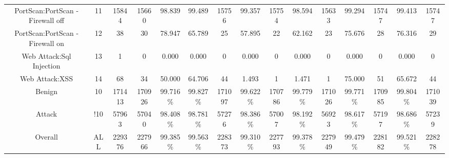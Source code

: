 \begin{table}[htb]
\begin{tabular}{@{}ccccccccccccccc@{}}
        PortScan:PortScan - Firewall off &  11 &  15844 &  15660 &  98.839 &  99.489 &  15756 &  99.357 &  15754 &  98.594 &  15633 &  99.294 &  15747 &  99.413 &  15747 \\
        PortScan:PortScan - Firewall on &  12 &  38 &  30 &  78.947 &  65.789 &  25 &  57.895 &  22 &  62.162 &  23 &  75.676 &  28 &  76.316 &  29 \\
        Web Attack:Sql Injection &  13 &  1 &  0 &  0.000 &  0.000 &  0 &  0.000 &  0 &  0.000 &  0 &  0.000 &  0 &  0.000 &  0 \\
        Web Attack:XSS &  14 &  68 &  34 &  50.000 &  64.706 &  44 &  1.493 &  1 &  1.471 &  1 &  75.000 &  51 &  65.672 &  44 \\
        Benign &  10 &  171413 &  170926 &  99.716\% &  99.827\% &  171097 &  99.622\% &  170786 &  99.779\% &  171026 &  99.771\% &  170985 &  99.804\% &  171039 \\
        Attack &  !10 &  57963 &  57040 &  98.408\% &  98.781\% &  57276 &  98.386\% &  57007 &  98.192\% &  56923 &  98.617\% &  57197 &  98.686\% &  57239 \\
        Overall &  ALL &  229376 &  227966 &  99.385\% &  99.563\% &  228373 &  99.310\% &  227793 &  99.378\% &  227949 &  99.479\% &  228182 &  99.521\% &  228278 \\
        \bottomrule
    \end{tabular}
\end{table}